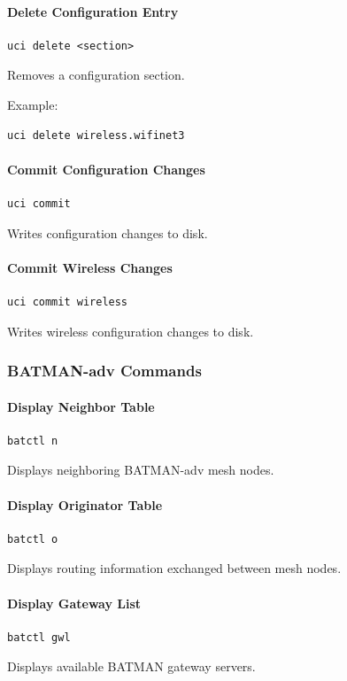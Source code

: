 \documentclass[conference]{IEEEtran}
\begin{document}
\paragraph{Delete Configuration Entry}
\begin{verbatim}
uci delete <section>
\end{verbatim}
Removes a configuration section.

Example:
\begin{verbatim}
uci delete wireless.wifinet3
\end{verbatim}

\paragraph{Commit Configuration Changes}
\begin{verbatim}
uci commit
\end{verbatim}
Writes configuration changes to disk.

\paragraph{Commit Wireless Changes}
\begin{verbatim}
uci commit wireless
\end{verbatim}
Writes wireless configuration changes to disk.

\subsubsection{BATMAN-adv Commands}

\paragraph{Display Neighbor Table}
\begin{verbatim}
batctl n
\end{verbatim}
Displays neighboring BATMAN-adv mesh nodes.

\paragraph{Display Originator Table}
\begin{verbatim}
batctl o
\end{verbatim}
Displays routing information exchanged between mesh nodes.

\paragraph{Display Gateway List}
\begin{verbatim}
batctl gwl
\end{verbatim}
Displays available BATMAN gateway servers.
\end{document}
